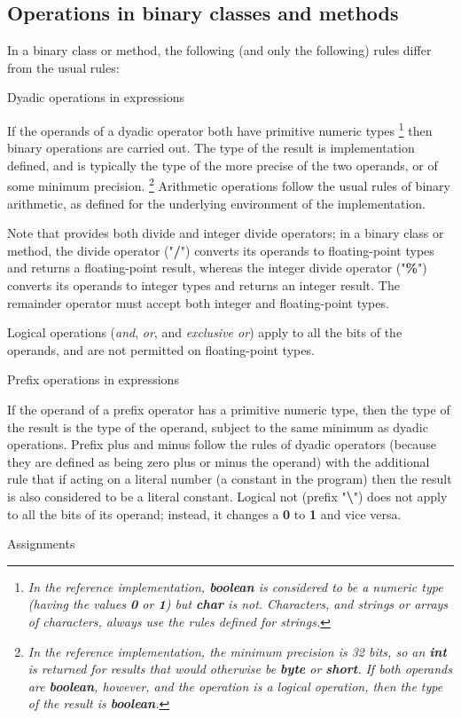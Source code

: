 \subsection{Operations in binary classes and methods}\label{refbindif}
 
In a binary class or method, the following (and only the following)
rules differ from the usual rules:
\begin{description}
\item{Dyadic operations in expressions}
 
If the operands of a dyadic operator both have primitive numeric types
\footnote{
\emph{In the reference implementation, \textbf{boolean} is considered to
be a numeric type (having the values \textbf{0} or \textbf{1})
but \textbf{char} is not.
Characters, and strings or arrays of characters, always use the rules
defined for \nr{} strings.}
}
then binary operations are carried out.  The type of the result is
implementation defined, and is typically the type of the more precise of
the two operands, or of some minimum precision.
\footnote{
\emph{In the reference implementation, the minimum precision is 32 bits,
so an \textbf{int} is returned for results that would otherwise
be \textbf{byte} or \textbf{short}.
If both operands are \textbf{boolean}, however, and the operation is a
logical operation, then the type of the result
is \textbf{boolean}.}
}
Arithmetic operations follow the usual rules of binary arithmetic, as
defined for the underlying environment of the implementation.
 
Note that \nr{} provides both divide and integer divide operators; in
a binary class or method, the divide operator ("\textbf{/}")
converts its operands to floating-point types and returns a
floating-point result, whereas the integer divide operator
("\textbf{\%}") converts its operands to integer types and
returns an integer result.
The remainder operator must accept both integer and floating-point
types.
 
Logical operations (\emph{and}, \emph{or}, and \emph{exclusive
or}) apply to all the bits of the operands, and are not permitted
on floating-point types.
\item{Prefix operations in expressions}
 
If the operand of a prefix operator has a primitive numeric type, then
the type of the result is the type of the operand, subject to
the same minimum as dyadic operations.
Prefix plus and minus follow the rules of dyadic operators (because they
are defined as being zero plus or minus the operand) with the additional
rule that if acting on a literal number (a constant in the program) then
the result is also considered to be a literal constant.
Logical not (prefix "\textbf{\textbackslash }") does not apply to all
the bits of its operand; instead, it changes a \textbf{0}
to \textbf{1} and vice versa.
\item{Assignments}
 

\end{description}
